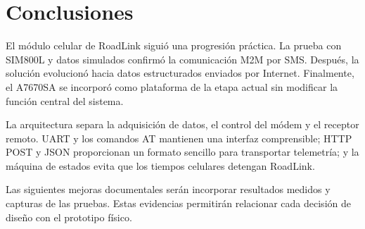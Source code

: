 \documentclass[11pt,letterpaper]{article}
\begin{document}
\section{Conclusiones}

El módulo celular de RoadLink siguió una progresión práctica. La prueba con
SIM800L y datos simulados confirmó la comunicación M2M por SMS. Después, la
solución evolucionó hacia datos estructurados enviados por Internet. Finalmente,
el A7670SA se incorporó como plataforma de la etapa actual sin modificar la
función central del sistema.

La arquitectura separa la adquisición de datos, el control del módem y el
receptor remoto. UART y los comandos AT mantienen una interfaz comprensible;
HTTP POST y JSON proporcionan un formato sencillo para transportar telemetría;
y la máquina de estados evita que los tiempos celulares detengan RoadLink.

Las siguientes mejoras documentales serán incorporar resultados medidos y
capturas de las pruebas. Estas evidencias permitirán
relacionar cada decisión de diseño con el prototipo físico.
\end{document}
